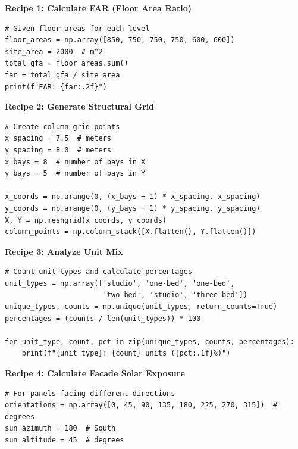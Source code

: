 

\begin{tcolorbox}[
    title=Copy-Paste Recipes,
    colframe=green,
    colback = white,
    arc=2mm
]
\textbf{Recipe 1: Calculate FAR (Floor Area Ratio)}
\begin{lstlisting}[basicstyle=\ttfamily\footnotesize,breaklines=true,columns=fullflexible,keepspaces=true,xleftmargin=0pt]
# Given floor areas for each level
floor_areas = np.array([850, 750, 750, 750, 600, 600])
site_area = 2000  # m^2
total_gfa = floor_areas.sum()
far = total_gfa / site_area
print(f"FAR: {far:.2f}")

\end{lstlisting}

\textbf{Recipe 2: Generate Structural Grid}
\begin{lstlisting}[basicstyle=\ttfamily\footnotesize,breaklines=true,columns=fullflexible,keepspaces=true,xleftmargin=0pt]
# Create column grid points
x_spacing = 7.5  # meters
y_spacing = 8.0  # meters
x_bays = 8  # number of bays in X
y_bays = 5  # number of bays in Y

x_coords = np.arange(0, (x_bays + 1) * x_spacing, x_spacing)
y_coords = np.arange(0, (y_bays + 1) * y_spacing, y_spacing)
X, Y = np.meshgrid(x_coords, y_coords)
column_points = np.column_stack([X.flatten(), Y.flatten()])

\end{lstlisting}

\textbf{Recipe 3: Analyze Unit Mix}
\begin{lstlisting}[basicstyle=\ttfamily\footnotesize,breaklines=true,columns=fullflexible,keepspaces=true,xleftmargin=0pt]
# Count unit types and calculate percentages
unit_types = np.array(['studio', 'one-bed', 'one-bed', 
                       'two-bed', 'studio', 'three-bed'])
unique_types, counts = np.unique(unit_types, return_counts=True)
percentages = (counts / len(unit_types)) * 100

for unit_type, count, pct in zip(unique_types, counts, percentages):
    print(f"{unit_type}: {count} units ({pct:.1f}%)")

\end{lstlisting}

\textbf{Recipe 4: Calculate Facade Solar Exposure}
\begin{lstlisting}[basicstyle=\ttfamily\footnotesize,breaklines=true,columns=fullflexible,keepspaces=true,xleftmargin=0pt]
# For panels facing different directions
orientations = np.array([0, 45, 90, 135, 180, 225, 270, 315])  # degrees
sun_azimuth = 180  # South
sun_altitude = 45  # degrees


\end{lstlisting}
\end{tcolorbox}

